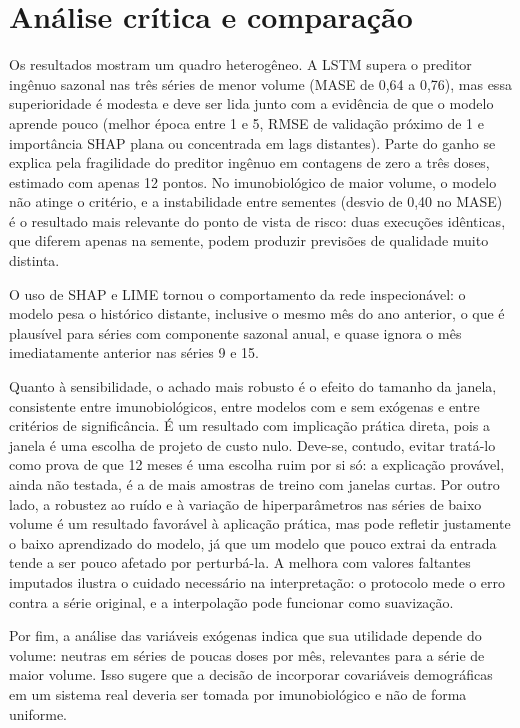 \documentclass[
    12pt,
    openright,
    oneside,
    a4paper,
    english,
    brazil
]{abntex2}
\begin{document}
\section{Análise crítica e comparação}

Os resultados mostram um quadro heterogêneo. A LSTM supera o preditor ingênuo sazonal nas três séries de menor volume (MASE de 0,64 a 0,76), mas essa superioridade é modesta e deve ser lida junto com a evidência de que o modelo aprende pouco (melhor época entre 1 e 5, RMSE de validação próximo de 1 e importância SHAP plana ou concentrada em lags distantes). Parte do ganho se explica pela fragilidade do preditor ingênuo em contagens de zero a três doses, estimado com apenas 12 pontos. No imunobiológico de maior volume, o modelo não atinge o critério, e a instabilidade entre sementes (desvio de 0,40 no MASE) é o resultado mais relevante do ponto de vista de risco: duas execuções idênticas, que diferem apenas na semente, podem produzir previsões de qualidade muito distinta.

O uso de SHAP e LIME tornou o comportamento da rede inspecionável: o modelo pesa o histórico distante, inclusive o mesmo mês do ano anterior, o que é plausível para séries com componente sazonal anual, e quase ignora o mês imediatamente anterior nas séries 9 e 15.

Quanto à sensibilidade, o achado mais robusto é o efeito do tamanho da janela, consistente entre imunobiológicos, entre modelos com e sem exógenas e entre critérios de significância. É um resultado com implicação prática direta, pois a janela é uma escolha de projeto de custo nulo. Deve-se, contudo, evitar tratá-lo como prova de que 12 meses é uma escolha ruim por si só: a explicação provável, ainda não testada, é a de mais amostras de treino com janelas curtas. Por outro lado, a robustez ao ruído e à variação de hiperparâmetros nas séries de baixo volume é um resultado favorável à aplicação prática, mas pode refletir justamente o baixo aprendizado do modelo, já que um modelo que pouco extrai da entrada tende a ser pouco afetado por perturbá-la. A melhora com valores faltantes imputados ilustra o cuidado necessário na interpretação: o protocolo mede o erro contra a série original, e a interpolação pode funcionar como suavização.

Por fim, a análise das variáveis exógenas indica que sua utilidade depende do volume: neutras em séries de poucas doses por mês, relevantes para a série de maior volume. Isso sugere que a decisão de incorporar covariáveis demográficas em um sistema real deveria ser tomada por imunobiológico e não de forma uniforme.
\end{document}
